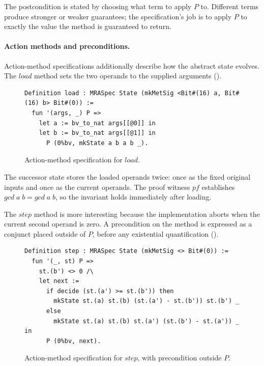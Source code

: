 \documentclass[fontset=fira-newtxsf]{mitthesis}
\theoremstyle{definition}
\theoremstyle{plain}
\begin{document}
The postcondition is stated by choosing what term to apply $P$ to.
Different terms produce stronger or weaker guarantees; the specification's job is to apply $P$ to exactly the value the method is guaranteed to return.

\paragraph{Action methods and preconditions.}
Action-method specifications additionally describe how the abstract state evolves.
The $\mathit{load}$ method sets the two operands to the supplied arguments ().

\begin{figure}[H]
\begin{verbatim}
Definition load : MRASpec State (mkMetSig <Bit#(16) a, Bit#(16) b> Bit#(0)) :=
  fun '(args, _) P =>
    let a := bv_to_nat args[[@0]] in
    let b := bv_to_nat args[[@1]] in
      P (0%bv, mkState a b a b _).
\end{verbatim}
\caption[GCD load spec]{Action-method specification for $\mathit{load}$.}
\label{fig:gcd-load-spec}
\end{figure}

The successor state stores the loaded operands twice: once as the fixed original inputs and once as the current operands.
The proof witness $\mathit{pf}$ establishes $\mathit{gcd}\;\mathit{a}\;\mathit{b} = \mathit{gcd}\;\mathit{a}\;\mathit{b}$, so the invariant holds immediately after loading.

The $\mathit{step}$ method is more interesting because the implementation aborts when the current second operand is zero.
A precondition on the method is expressed as a conjunct placed outside of $P$, before any existential quantification ().

\begin{figure}[H]
\begin{verbatim}
Definition step : MRASpec State (mkMetSig <> Bit#(0)) :=
  fun '(_, st) P =>
    st.(b') <> 0 /\
    let next :=
      if decide (st.(a') >= st.(b')) then
        mkState st.(a) st.(b) (st.(a') - st.(b')) st.(b') _
      else
        mkState st.(a) st.(b) st.(a') (st.(b') - st.(a')) _ in
      P (0%bv, next).
\end{verbatim}
\caption[GCD step spec]{Action-method specification for $\mathit{step}$, with precondition outside $P$.}
\label{fig:gcd-step-spec}
\end{figure}
\end{document}
